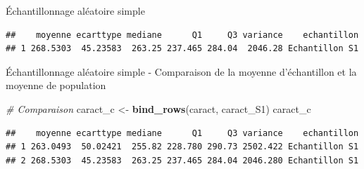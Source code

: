 \documentclass[ignorenonframetext,]{beamer}
\newenvironment{Shaded}{\begin{snugshade}}{\end{snugshade}}
\newcommand{\KeywordTok}[1]{\textcolor[rgb]{0.13,0.29,0.53}{\textbf{#1}}}
\newcommand{\DataTypeTok}[1]{\textcolor[rgb]{0.13,0.29,0.53}{#1}}
\newcommand{\FloatTok}[1]{\textcolor[rgb]{0.00,0.00,0.81}{#1}}
\newcommand{\StringTok}[1]{\textcolor[rgb]{0.31,0.60,0.02}{#1}}
\newcommand{\CommentTok}[1]{\textcolor[rgb]{0.56,0.35,0.01}{\textit{#1}}}
\newcommand{\OtherTok}[1]{\textcolor[rgb]{0.56,0.35,0.01}{#1}}
\newcommand{\OperatorTok}[1]{\textcolor[rgb]{0.81,0.36,0.00}{\textbf{#1}}}
\newcommand{\NormalTok}[1]{#1}
\begin{document}
\begin{frame}[fragile]{Échantillonnage aléatoire simple}

\begin{Shaded}
\end{Shaded}

\begin{verbatim}
##    moyenne ecarttype mediane      Q1     Q3 variance    echantillon
## 1 268.5303  45.23583  263.25 237.465 284.04  2046.28 Echantillon S1
\end{verbatim}

\end{frame}

\begin{frame}[fragile]{Échantillonnage aléatoire simple - Comparaison de
la moyenne d'échantillon et la moyenne de population}

\begin{Shaded}
\begin{Highlighting}[]
\CommentTok{# Comparaison}
\NormalTok{caract_c <-}\StringTok{ }\KeywordTok{bind_rows}\NormalTok{(caract, caract_S1)}
\NormalTok{caract_c}
\end{Highlighting}
\end{Shaded}

\begin{verbatim}
##    moyenne ecarttype mediane      Q1     Q3 variance    echantillon
## 1 263.0493  50.02421  255.82 228.780 290.73 2502.422 Echantillon S1
## 2 268.5303  45.23583  263.25 237.465 284.04 2046.280 Echantillon S1
\end{verbatim}

\end{frame}
\end{document}
